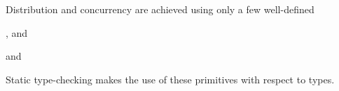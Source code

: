 \documentclass[a4,12pt]{seminar}
\begin{document}
\begin{slide}

\vskip 4mm
Distribution and concurrency are achieved using only
a few well-defined 
\vskip 8mm

\begin{dinglist}{\dingC}
\item {},  and 
\item {} and 
\item {}
\end{dinglist}

\vskip 5mm
Static type-checking makes the use of these primitives 
with respect to types.

\end{slide}
\end{document}
